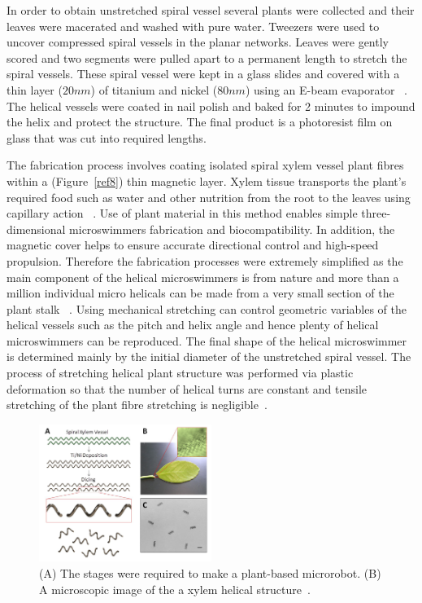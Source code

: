 \documentclass[12pt,a4paper,titlepage]{report}
\begin{document}
In order to obtain unstretched spiral vessel several plants were collected and their leaves were 
macerated and washed with pure water. Tweezers were used to uncover compressed spiral vessels 
in the planar networks. Leaves were gently scored and two segments were pulled apart to a permanent
 length to stretch the spiral vessels. These spiral vessel were kept in a glass slides and covered with a 
thin layer ($20 nm$) of titanium and nickel ($80 nm$) using an 
E-beam evaporator ~\citep{mahoney2011velocity}. The helical vessels were coated in nail 
polish and baked for 2 minutes to impound the helix and protect the structure. The final product is 
a photoresist film on glass that was cut into required lengths.      
  

The fabrication process involves coating isolated spiral xylem vessel plant fibres within a (Figure~\ref{ref8})
thin magnetic layer. Xylem tissue transports the plant\rq{}s required food such as water and other 
nutrition from the root to the leaves using capillary action ~\citep{mahoney2011velocity}.
Use of plant material in this method enables simple three-dimensional microswimmers fabrication 
and biocompatibility. In addition, the magnetic cover helps to ensure accurate directional control and 
high-speed propulsion. Therefore the fabrication processes were extremely simplified as the main 
component of the helical microswimmers is from nature and more than a million individual micro helicals 
can be made from a very small section of the plant stalk ~\citep{mahoney2011velocity}. Using mechanical stretching can control geometric variables of the helical vessels such as the pitch and
 helix angle and hence plenty of helical microswimmers can be reproduced. The final shape of the 
helical microswimmer is determined mainly by the initial diameter of the unstretched spiral vessel. The
 process of stretching helical plant structure was performed via plastic deformation so that the number 
of helical turns are constant and tensile stretching of the plant fibre stretching is negligible~\citep{mahoney2011velocity}. 


\begin{figure}
  \begin{center}
    \includegraphics[width=0.5\textwidth]{plants2}
  \caption{(A) The stages were required to make a plant-based microrobot. (B) A microscopic image of the 
a xylem helical structure~\citep{gao2013bioinspired}.}
  \label{plants2}
\end{center}
\end{figure}
\end{document}
